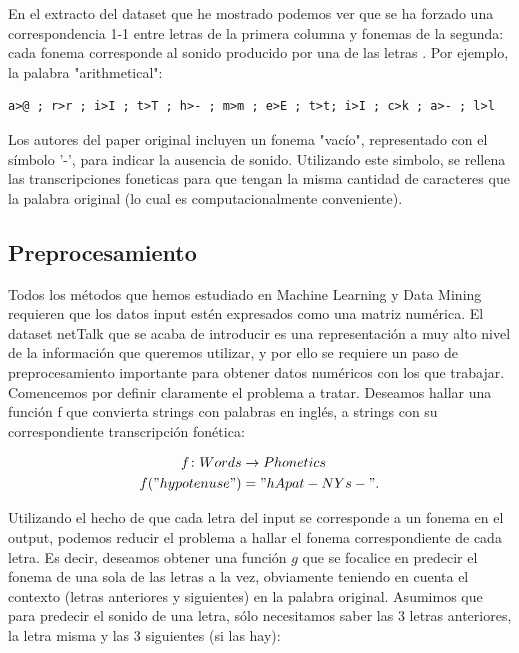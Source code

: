 \documentclass[paper=a4, fontsize=11pt]{scrartcl} %
\numberwithin{equation}{section} %
\numberwithin{figure}{section} %
\numberwithin{table}{section} %
\begin{document}
En el extracto del dataset que he mostrado podemos ver que se ha forzado una correspondencia 1-1 entre letras de la primera columna y fonemas de la segunda: cada fonema corresponde al sonido producido por una de las letras . Por ejemplo, la palabra "arithmetical": 

\begin{center}

\begin{BVerbatim}
a>@ ; r>r ; i>I ; t>T ; h>- ; m>m ; e>E ; t>t; i>I ; c>k ; a>- ; l>l               
\end{BVerbatim}

\end{center}

Los autores del paper original incluyen un fonema "vacío", representado con el símbolo '-', para indicar la ausencia de sonido. Utilizando este simbolo, se rellena las transcripciones foneticas para que tengan la misma cantidad de caracteres que la palabra original (lo cual es computacionalmente conveniente).



\subsection{Preprocesamiento}

Todos los métodos que hemos estudiado en Machine Learning y Data Mining requieren que los datos input estén expresados como una matriz numérica. El dataset netTalk que se acaba de introducir es una representación a muy alto nivel de la información que queremos utilizar, y por ello se requiere un paso de preprocesamiento importante para obtener datos numéricos con los que trabajar. \\
\newpage
Comencemos por definir claramente el problema a tratar. Deseamos hallar una función f que convierta strings con palabras en inglés, a strings con su correspondiente transcripción fonética:

\begin{align*}
  f \colon Words &\to Phonetics \\
  f("hypotenuse") &= "hApat-NYs-".
\end{align*}

Utilizando el hecho de que cada letra del input se corresponde a un fonema en el output, podemos reducir el problema a hallar el fonema correspondiente de cada letra. Es decir, deseamos obtener una función $g$ que se focalice en predecir el fonema de una sola de las letras a la vez, obviamente teniendo en cuenta el contexto (letras anteriores y siguientes) en la palabra original. Asumimos que para predecir el sonido de una letra, sólo necesitamos saber las 3 letras anteriores, la letra misma y las 3 siguientes (si las hay):
\end{document}
